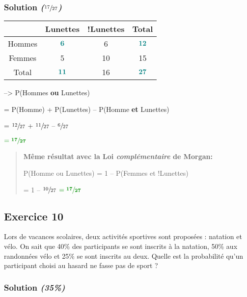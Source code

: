 \documentclass[french]{article}
\begin{document}
\subsubsection{Solution \emph{(\(\sfrac{17}{27}\))}}
\label{sec:org07f250d}

\begin{center}
\begin{tabular}{c|c|c|c|}
 & Lunettes & !Lunettes & Total\\
\hline
Hommes & \(\textcolor{teal}{\bold{6}}\) & 6 & \(\textcolor{teal}{\bold{12}}\)\\
\hline
Femmes & 5 & 10 & 15\\
\hline
Total & \(\textcolor{teal}{\bold{11}}\) & 16 & \(\textcolor{teal}{\bold{27}}\)\\
\end{tabular}
\end{center}

--> P(Hommes \textbf{ou} Lunettes)

= P(Homme) + P(Lunettes) -- P(Homme \textbf{et} Lunettes)

= \(\sfrac{12}{27}\) + \(\sfrac{11}{27}\) -- \(\sfrac{6}{27}\)

\(\textcolor{luckydarkgreen}{\mathbf{= \sfrac{17}{27}}}\)

\begin{quote}
\textbf{Même résultat avec la Loi \emph{complémentaire} de Morgan:}

P(Homme ou Lunettes) = 1 -- P(Femmes et !Lunettes)

= 1 -- \(\sfrac{10}{27}\) \(\textcolor{luckydarkgreen}{\mathbf{= \sfrac{17}{27}}}\)
\end{quote}

\subsection{Exercice 10}
\label{sec:org2853394}

Lors de vacances scolaires, deux activités sportives sont proposées : natation et vélo. On sait que 40\% des participants se sont inscrits à la natation, 50\% aux randonnées vélo et 25\% se sont inscrits au deux. Quelle est la probabilité qu’un participant choisi au hasard ne fasse pas de sport ?

\subsubsection{Solution \emph{(35\%)}}
\label{sec:orgb97e475}
\end{document}
